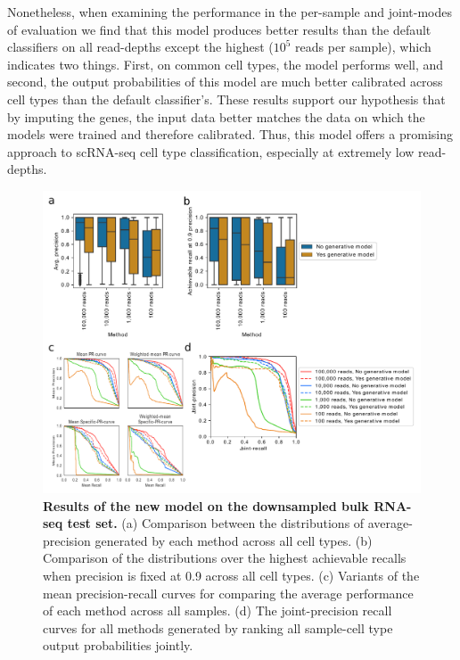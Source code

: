 Nonetheless, when examining the performance in the per-sample and joint-modes of evaluation we find that this model produces better results than the default classifiers on all read-depths except the highest ($10^5$ reads per sample), which indicates two things. First, on common cell types, the model performs well, and second, the output probabilities of this model are much better calibrated across cell types than the default classifier's.  These results support our hypothesis that by imputing the genes, the input data better matches the data on which the models were trained and therefore calibrated.  Thus, this model offers a promising approach to scRNA-seq cell type classification, especially at extremely low read-depths. 

  \begin{figure}[htbp]
\centering
\includegraphics[width=13cm]{figures/new_model_results.pdf}  
\caption{\textbf{Results of the new model on the downsampled bulk RNA-seq test set.} (a) Comparison between the distributions of average-precision generated by each method across all cell types.  (b) Comparison of the distributions over the highest achievable recalls when precision is fixed at 0.9 across all cell types. (c) Variants of the mean precision-recall curves for comparing the average performance of each method across all samples. (d) The joint-precision recall curves for all methods generated by ranking all sample-cell type output probabilities jointly.}
\label{fig:diff_cell_types}
\end{figure}
 
